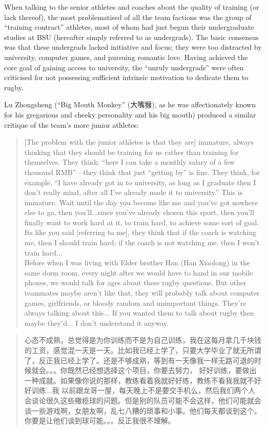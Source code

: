 \begin{CJK}{UTF8}{gbsn}
When talking to the senior athletes and coaches about the quality of training (or lack thereof), the most problematised of all the team factions was the group of ``training contract'' athletes, most of whom had just begun their undergraduate studies at BSU (hereafter simply referred to as undergrads).  The basic consensus was that these undergrads lacked initiative and focus; they were too distracted by university, computer games, and pursuing romantic love. Having achieved the core goal of gaining access to university, the ``unruly undergrads'' were often criticised for not possessing sufficient intrinsic motivation to dedicate them to rugby.

Lu Zhongsheng (``Big Mouth Monkey'' (大嘴猴), as he was affectionately known for his gregarious and cheeky personality and his big mouth) produced a similar critique of the team's more junior athletes:

      \begin{quote}
        [The problem with the junior athletes is that they are] immature, always thinking that they should be training for us rather than training for themselves.  They think: ``here I can take a monthly salary of a few thousand RMB''---they think that just ``getting by'' is fine.  They think, for example,  ``I have already got in to university, as long as I graduate then I don't really mind, after all I've already made it to university.''  This is immature.  Wait until the day you become like me and you've got nowhere else to go, then you'll...since you've already chosen this sport, then you'll finally want to work hard at it, to train hard, to achieve some sort of goal.  Its like you said [referring to me], they think that if the coach is watching me, then I should train hard; if the coach is not watching me, then I won't train hard...\\

        Before when I was living with Elder brother Han (Han Xiaolong) in the same dorm room, every night after we would have to hand in our mobile phones, we would talk for ages about these rugby questions. But other teammates maybe aren't like that, they will probably talk about computer games, girlfriends, or bloody random and unimportant things.  They're always talking about this... If you wanted them to talk about rugby then maybe they'd... I don't understand it anyway.
      \end{quote}

      \begin{quote}
        心态不成熟，总觉得是为你训练而不是为自己训练，我在这每月拿几千块钱的工资，感觉混一天是一天。比如我已经上学了，只要大学毕业了就无所谓了，反正我已经上学了。还是不够成熟，等到有一天像我一样无路可退的时候就会。。。你既然已经想选择这个项目，你要去努力， 好好训练，要做出一种成就。如果像你说的那样，教练看着我就好好练，教练不看我我就不好好训练...我
    以前跟龙哥一屋，每天晚上不是要交手机么，然后我们两个人会谈论很久这些橄榄球的问题。但是别的队员可能不会这样，他们可能就会谈一些游戏啊，女朋友啊，乱七八糟的琐事和小事。他们每天都谈到这个。你要是让他们谈到球可能。。。反正我很不理解。
      \end{quote}


\end{CJK}
